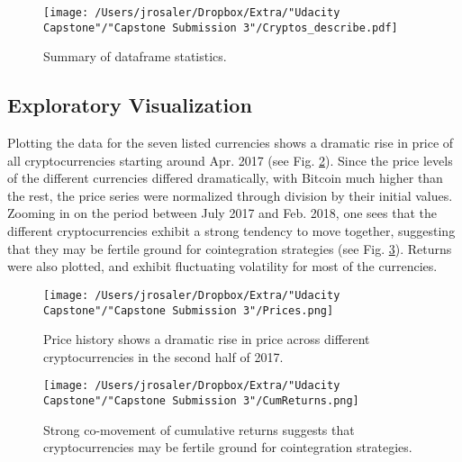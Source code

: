\documentclass{article}
\begin{document}
\begin{figure}[]
\texttt{[image: /Users/jrosaler/Dropbox/Extra/"Udacity Capstone"/"Capstone Submission 3"/Cryptos\_describe.pdf]}
\caption{Summary of dataframe statistics. }
\label{FigStats}
\end{figure}



\subsection{Exploratory Visualization}

Plotting the data for the seven listed currencies shows a dramatic rise in price of all cryptocurrencies starting around Apr. 2017 (see Fig. \ref{FigPrices}). Since the price levels of the different currencies differed dramatically, with Bitcoin much higher than the rest, the price series were normalized through division by their initial values. Zooming in on the period between July 2017 and Feb. 2018, one sees that the different cryptocurrencies exhibit a strong tendency to move together, suggesting that they may be fertile ground for cointegration strategies (see Fig. \ref{FigCumRet}). Returns were also plotted, and exhibit fluctuating volatility for most of the currencies.  


\begin{figure}[]
\texttt{[image: /Users/jrosaler/Dropbox/Extra/"Udacity Capstone"/"Capstone Submission 3"/Prices.png]}
\caption{Price history shows a dramatic rise in price across different cryptocurrencies in the second half of 2017. }
\label{FigPrices}
\end{figure}

\begin{figure}[]
\texttt{[image: /Users/jrosaler/Dropbox/Extra/"Udacity Capstone"/"Capstone Submission 3"/CumReturns.png]}
\caption{Strong co-movement of cumulative returns suggests that cryptocurrencies may be fertile ground for cointegration strategies. }
\label{FigCumRet}
\end{figure}

\end{document}
